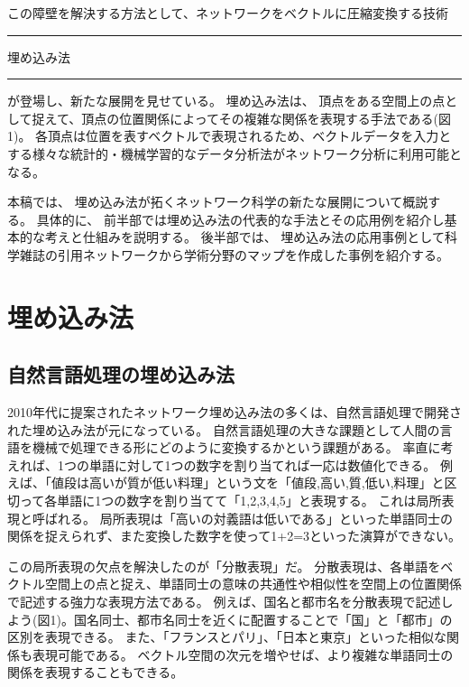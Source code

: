 \documentclass[J]{scitrans}
\def\ddash{\rule[0.33zh]{2zw}{.03zh}}
\begin{document}
この障壁を解決する方法として、ネットワークをベクトルに圧縮変換する技術\ddash 埋め込み法\ddash が登場し、新たな展開を見せている。
埋め込み法は、 頂点をある空間上の点として捉えて、頂点の位置関係によってその複雑な関係を表現する手法である(図1)。
各頂点は位置を表すベクトルで表現されるため、ベクトルデータを入力とする様々な統計的・機械学習的なデータ分析法がネットワーク分析に利用可能となる。

本稿では、 埋め込み法が拓くネットワーク科学の新たな展開について概説する。
具体的に、 前半部では埋め込み法の代表的な手法とその応用例を紹介し基本的な考えと仕組みを説明する。
後半部では、 埋め込み法の応用事例として科学雑誌の引用ネットワークから学術分野のマップを作成した事例を紹介する。

\section{埋め込み法}

\subsection{自然言語処理の埋め込み法}

2010年代に提案されたネットワーク埋め込み法の多くは、自然言語処理で開発された埋め込み法が元になっている。
自然言語処理の大きな課題として人間の言語を機械で処理できる形にどのように変換するかという課題がある。
率直に考えれば、1つの単語に対して1つの数字を割り当てれば一応は数値化できる。
例えば、「値段は高いが質が低い料理」という文を「値段,高い,質,低い,料理」と区切って各単語に1つの数字を割り当てて「1,2,3,4,5」と表現する。
これは局所表現と呼ばれる。
局所表現は「高いの対義語は低いである」といった単語同士の関係を捉えられず、また変換した数字を使って1+2=3といった演算ができない。

この局所表現の欠点を解決したのが「分散表現」だ。
分散表現は、各単語をベクトル空間上の点と捉え、単語同士の意味の共通性や相似性を空間上の位置関係で記述する強力な表現方法である。
例えば、国名と都市名を分散表現で記述しよう(図1)。国名同士、都市名同士を近くに配置することで「国」と「都市」の区別を表現できる。
また、「フランスとパリ」、「日本と東京」といった相似な関係も表現可能である。
ベクトル空間の次元を増やせば、より複雑な単語同士の関係を表現することもできる。

\end{document}

